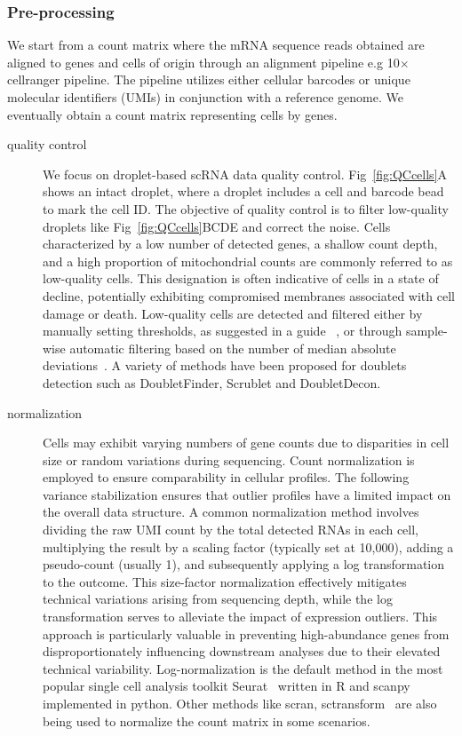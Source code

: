 \subsubsection{Pre-processing}
We start from a count matrix where the mRNA sequence reads obtained are aligned to genes and cells of origin through an alignment pipeline e.g 10$\times$ cellranger pipeline. The pipeline utilizes either cellular barcodes or unique molecular identifiers (UMIs) in conjunction with a reference genome. We eventually obtain a count matrix representing cells by genes. 
\begin{description}
	\item[quality control] 
	We focus on droplet-based scRNA data quality control. Fig~\ref{fig:QCcells}A shows an intact droplet, where a droplet includes a cell and barcode bead to mark the cell ID. The objective of quality control is to filter low-quality droplets like Fig~\ref{fig:QCcells}BCDE and correct the noise. Cells characterized by a low number of detected genes, a shallow count depth, and a high proportion of mitochondrial counts are commonly referred to as low-quality cells. This designation is often indicative of cells in a state of decline, potentially exhibiting compromised membranes associated with cell damage or death. Low-quality cells are detected and filtered either by manually setting thresholds, as suggested in a guide ~\citep{luecken2019current}, or through sample-wise automatic filtering based on the number of median absolute deviations~\citep{germain2020pipecomp}. A variety of methods have been proposed for doublets detection such as DoubletFinder, Scrublet and DoubletDecon\citep{mcginnis2019doubletfinder, wolock2019scrublet, depasquale2019doubletdecon}.

	\item[normalization]
	Cells may exhibit varying numbers of gene counts due to disparities in cell size or random variations during sequencing. Count normalization is employed to ensure comparability in cellular profiles. The following variance stabilization ensures that outlier profiles have a limited impact on the overall data structure. A common normalization method involves dividing the raw UMI count by the total detected RNAs in each cell, multiplying the result by a scaling factor (typically set at 10,000), adding a pseudo-count (usually 1), and subsequently applying a log transformation to the outcome. This size-factor normalization effectively mitigates technical variations arising from sequencing depth, while the log transformation serves to alleviate the impact of expression outliers. This approach is particularly valuable in preventing high-abundance genes from disproportionately influencing downstream analyses due to their elevated technical variability. Log-normalization is the default method in the most popular single cell analysis toolkit Seurat~\citep{stuart2019seurat3} written in R and scanpy\citep{wolf2018scanpy} implemented in python. Other methods like scran, sctransform~\citep{l2016scran,hafemeister2019sctransform} are also being used to normalize the count matrix in some scenarios.


\end{description}
